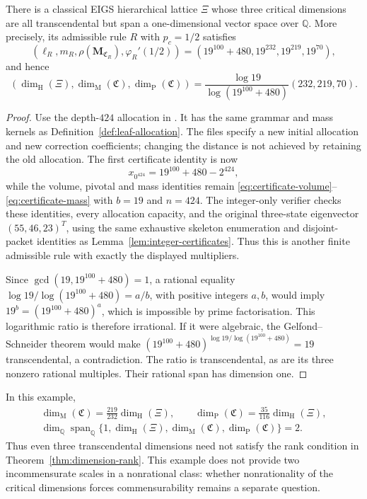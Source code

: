 \begin{theorem}\label{thm:transcendental-dependent-dimensions}
There is a classical EIGS hierarchical lattice $\Xi$ whose three critical dimensions are all transcendental but span a one-dimensional vector space over $\mathbb Q$. More precisely, its admissible rule $R$ with $p_c=1/2$ satisfies
\[
 (\ell_R,m_R,\rho(\mathbf M_{\mathfrak C_R}),\varphi_R'(1/2))
 =(19^{100}+480,19^{232},19^{219},19^{70}),
\]
and hence
\[
 (\dim_{\mathrm H}(\Xi),\dim_{\mathrm M}(\mathfrak C),\dim_{\mathrm P}(\mathfrak C))
 =\frac{\log19}{\log(19^{100}+480)}(232,219,70).
\]
\end{theorem}
\begin{proof}
Use the depth-$424$ allocation in . It has the same grammar and mass kernels as Definition~\ref{def:leaf-allocation}. The files specify a new initial allocation and new correction coefficients; changing the distance is not achieved by retaining the old allocation. The first certificate identity is now
\[
 x_{0^{424}}=19^{100}+480-2^{424},
\]
while the volume, pivotal and mass identities remain
\eqref{eq:certificate-volume}--\eqref{eq:certificate-mass} with $b=19$ and $n=424$.
The integer-only verifier  checks these identities, every allocation capacity, and the original three-state eigenvector $(55,46,23)^T$, using the same exhaustive skeleton enumeration and disjoint-packet identities as Lemma~\ref{lem:integer-certificates}. Thus this is another finite admissible rule with exactly the displayed multipliers.

Since $\gcd(19,19^{100}+480)=1$, a rational equality
$\log19/\log(19^{100}+480)=a/b$, with positive integers $a,b$, would imply $19^b=(19^{100}+480)^a$, which is impossible by prime factorisation. This logarithmic ratio is therefore irrational. If it were algebraic, the Gelfond--Schneider theorem would make
$(19^{100}+480)^{\log19/\log(19^{100}+480)}=19$
transcendental, a contradiction. The ratio is transcendental, as are its three nonzero rational multiples. Their rational span has dimension one.
\end{proof}

In this example,
\begin{gather*}
 \dim_{\mathrm M}(\mathfrak C)=\frac{219}{232}\dim_{\mathrm H}(\Xi),\qquad
 \dim_{\mathrm P}(\mathfrak C)=\frac{35}{116}\dim_{\mathrm H}(\Xi),\\
 \dim_{\mathbb Q}\operatorname{span}_{\mathbb Q}
 \{1,\dim_{\mathrm H}(\Xi),\dim_{\mathrm M}(\mathfrak C),\dim_{\mathrm P}(\mathfrak C)\}=2.
\end{gather*}
Thus even three transcendental dimensions need not satisfy the rank condition in Theorem~\ref{thm:dimension-rank}. This example does not provide two incommensurate scales in a nonrational class: whether nonrationality of the critical dimensions forces commensurability remains a separate question.

